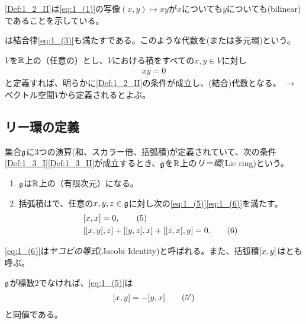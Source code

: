 \documentclass[../main]{subfiles}
\begin{document}
\begin{remark}
  \ref{Def:1_2_II}は\eqref{eq:1_(1)}の写像$(x,y)\mapsto xy$が$x$についても$y$についても(bilinear)であることを示している。
\end{remark}

\begin{named}
  は結合律\eqref{eq:1_(3)}も満たす{}である。このような代数を(または多元環)という。
\end{named}

\begin{named}
  $V$を$\mathbb{R}$上の（任意の）とし、$V$における積をすべての$x,y\in V$に対し
  \begin{align*}
    xy=0 \tag{4}\label{eq:1_(4)}
  \end{align*}
  と定義すれば、明らかに\ref{Def:1_2_II}の条件が成立し、(結合)代数となる。
  $\to$ ベクトル空間$V$から定義されるとよぶ。
\end{named}


\subsection{リー環の定義}

\begin{definition}[リー環]
  \label{Def:1_3}
  集合$\mathfrak{g}$に3つの演算(和、スカラー倍、括弧積)が定義されていて、次の条件\ref{Def:1_3_I}\ref{Def:1_3_II}が成立するとき、$\mathfrak{g}$を$\mathbb{R}$上の\emph{リー環}(Lie ring)という。
  \begin{enumerate}[label=(\Roman*$^\prime$)]
    \item \label{Def:1_3_I}
      $\mathfrak{g}$は$\mathbb{R}$上の（有限次元）になる。
    \item \label{Def:1_3_II}
      括弧積はで、任意の$x,y,z\in \mathfrak{g}$に対し次の\eqref{eq:1_(5)}\eqref{eq:1_(6)}を満たす。
    \begin{align}
      & \comm{x}{x} = 0, \tag{5}\label{eq:1_(5)}\\
      & \comm{\comm{x}{y}}{z}+\comm{\comm{y}{z}}{x}+\comm{\comm{z}{x}}{y}=0.\tag{6}\label{eq:1_(6)}
    \end{align}
  \end{enumerate}
\end{definition}
\begin{named}
  \eqref{eq:1_(6)}は\emph{ヤコビの等式}(Jacobi Identity)と呼ばれる。また、括弧積$\comm{x}{y}$はとも呼ぶ。
\end{named}
\begin{remark}
  $\mathfrak{g}$が標数$2$でなければ、\eqref{eq:1_(5)}は
  \begin{align}
    \comm{x}{y}=-\comm{y}{x} \tag{5$^\prime$}\label{eq:1_(5')}
  \end{align}
  と同値である。
\end{remark}
\end{document}
